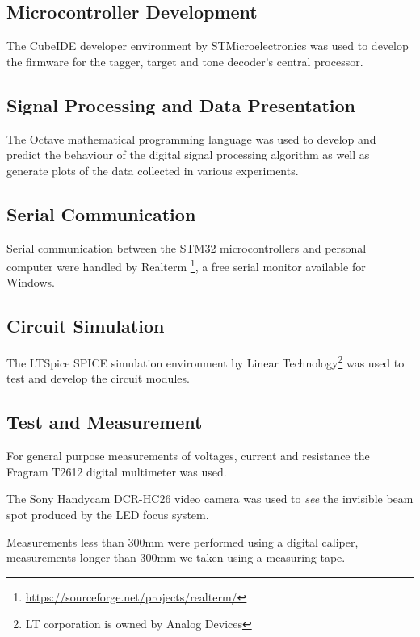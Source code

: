 \subsection{Microcontroller Development}
The CubeIDE developer environment by STMicroelectronics was used to develop the firmware for the tagger, target and tone decoder's central processor.

\subsection{Signal Processing and Data Presentation}
The Octave mathematical programming language was used to develop and predict the behaviour of the digital signal processing algorithm as well as generate plots of the data collected in various experiments.

\subsection{Serial Communication}
Serial communication between the STM32 microcontrollers and personal computer were handled by Realterm \footnote{\url{https://sourceforge.net/projects/realterm/}}, a free serial monitor available for Windows.

\subsection{Circuit Simulation}
The LTSpice SPICE simulation environment by Linear Technology\footnote{LT corporation is owned by Analog Devices} was used to test and develop the circuit modules.

\subsection{Test and Measurement}
For general purpose measurements of voltages, current and resistance the Fragram T2612 digital multimeter was used.

The Sony Handycam DCR-HC26 video camera was used to \textit{see} the invisible beam spot produced by the LED focus system.

Measurements less than 300mm were performed using a digital caliper, measurements longer than 300mm we taken using a measuring tape.






